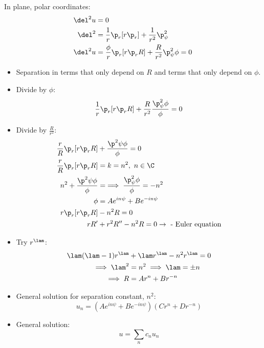 \documentclass[Maths.tex]{subfiles}
\begin{document}
\begin{example}
In plane, polar coordinates:
\begin{align}
	\del^2u &= 0 \\
	\del^2 &= \frac{1}{r}\p_r[r\p_r] + \frac{1}{r^2}\p^2_\psi \\
	\del^2u &= \frac{\phi}{r}\p_r[r\p_rR] + \frac{R}{r^2}\p_\psi^2\phi = 0
\end{align}
\begin{itemize}
	\item Separation in terms that only depend on $R$ and terms that only depend on $\phi$.
	\item Divide by $\phi$:
	\begin{equation}
		\frac{1}{r}\p_r[r\p_r R] + \frac{R}{r^2}\frac{\p_\psi^2\phi}{\phi} = 0
	\end{equation}
	\item Divide by $\frac{R}{r^2}$:
	\begin{align}
		\frac{r}{R}\p_r[r\p_rR] &+ \frac{\p^2\psi\phi}{\phi} = 0 \\
		\frac{r}{R}\p_r[r\p_rR] &= k = n^2,~ n \in \C \\
		n^2 + \frac{\p^2\psi\phi}{\phi} &= \implies \frac{\p^2_\psi\phi}{\phi} = -n^2 \\
		\phi &= Ae^{in\psi} + Be^{-in\psi} \\
		r\p_r[r\p_rR] &- n^2R = 0 \\
		rR' &+ r^2R'' - n^2R = 0 \to \text{ - Euler equation}
	\end{align}
	\item Try $r^\lam$:
	\begin{align}
		\lam(\lam-1)r^\lam &+ \lam r^{\lam} - n^2r^\lam = 0 \\
		\implies \lam^2 &= n^2 \implies \lam = \pm n \\
		\implies R &= Ar^n + Br^{-n}
	\end{align}
	\item General solution for separation constant, $n^2$:
	\begin{equation}
		u_n = \left(Ae^{in\psi} + Be^{-in\psi}\right)\left(Cr^n + Dr^{-n}\right)
	\end{equation}
	\item General solution:
	\begin{equation}
		u = \sum_n c_nu_n
	\end{equation}
\end{itemize}
\end{example}
\end{document}
